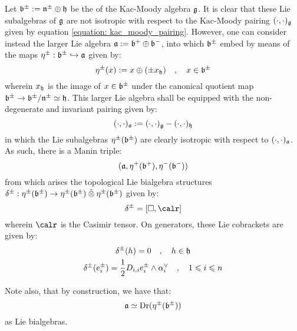 Let $\mathfrak{b}^{\pm} := \mathfrak{n}^{\pm} \oplus \mathfrak{h}$ be the  of the Kac-Moody algebra $\mathfrak{g}$. It is clear that these Lie subalgebras of $\mathfrak{g}$ are not isotropic with respect to the Kac-Moody pairing $(\cdot, \cdot)_{\mathfrak{g}}$ given by equation \eqref{equation: kac_moody_pairing}. However, one can consider instead the larger Lie algebra $\mathfrak{a} := \mathfrak{b}^+ \oplus \mathfrak{b}^-$, into which $\mathfrak{b}^{\pm}$ embed by means of the maps $\eta^{\pm}: \mathfrak{b}^{\pm} \hookrightarrow \mathfrak{a}$ given by:
    \begin{equation} \label{equation: borel_lie_sub_bialgebra_embeddings}
        \eta^{\pm}(x) := x \oplus ( \pm x_{\mathfrak{h}} ) \quad, \quad x \in \mathfrak{b}^{\pm}
    \end{equation}
wherein $x_{\mathfrak{h}}$ is the image of $x \in \mathfrak{b}^{\pm}$ under the canonical quotient map $\mathfrak{b}^{\pm} \to \mathfrak{b}^{\pm}/\mathfrak{n}^{\pm} \simeq \mathfrak{h}$. This larger Lie algebra shall be equipped with the non-degenerate and invariant pairing given by:
    $$(\cdot, \cdot)_{\mathfrak{a}} := (\cdot, \cdot)_{\mathfrak{g}} - (\cdot, \cdot)_{\mathfrak{h}}$$
in which the Lie subalgebras $\eta^{\pm}(\mathfrak{b}^{\pm})$ are clearly isotropic with respect to $(\cdot, \cdot)_{\mathfrak{a}}$. As such, there is a Manin triple:
    $$(\mathfrak{a}, \eta^+(\mathfrak{b}^+), \eta^-(\mathfrak{b}^-))$$
from which arises the topological Lie bialgebra structures $\delta^{\pm}: \eta^{\pm}(\b^{\pm}) \to \eta^{\pm}(\b^{\pm}) \hattensor \eta^{\pm}(\b^{\pm})$ given by:
    $$\delta^{\pm} = [\Box, \calr]$$
wherein $\calr$ is the Casimir tensor. On generators, these Lie cobrackets are given by:
    \begin{equation} \label{equation: standard_kac_moody_lie_bialgebra_structure}
        \begin{gathered}
            \delta^{\pm}(h) = 0 \quad, \quad h \in \mathfrak{h}
            \\
            \delta^{\pm}(e_i^{\pm}) = \frac12 D_{i, i} e_i^{\pm} \wedge \alpha_i^{\vee} \quad, \quad 1 \leqslant i \leqslant n
        \end{gathered}
    \end{equation}
\begin{remark}
    Note also, that by construction, we have that:
        $$\mathfrak{a} \simeq \operatorname{Dr}( \eta^{\pm}( \mathfrak{b}^{\pm} ) )$$
    as Lie bialgebras.
\end{remark}
    
